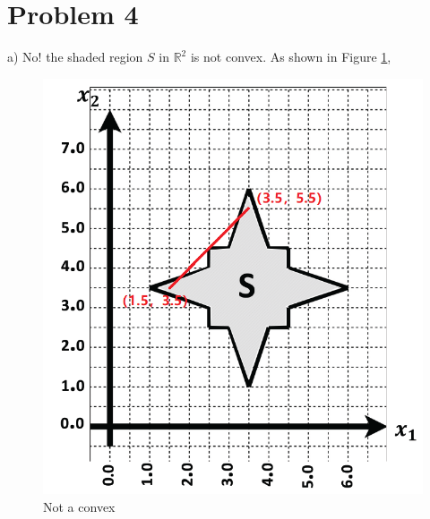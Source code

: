 \documentclass{article}
\begin{document}
\section*{Problem 4}
a) No! the shaded region $S$ in $\mathbb{R}^2$ is not convex. As shown in Figure \ref{not convex proof},
\begin{figure}[htbp]
	\centering
	\begin{minipage}{5cm}
		\centering
		\includegraphics[scale=0.5]{not_convex.png}
		\caption{Not a convex}
		\label{not convex proof}
	\end{minipage}
	\begin{minipage}{5cm}
		\centering

\end{minipage}
\end{figure}
\end{document}
